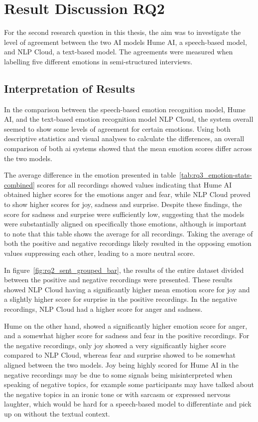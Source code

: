 
\section{Result Discussion RQ2}
For the second research question in this thesis, the aim was to investigate the level of agreement between the two AI models Hume AI, a speech-based model, and NLP Cloud, a text-based model. The agreements were measured when labelling five different emotions in semi-structured interviews.

\subsection{Interpretation of Results}
In the comparison between the speech-based emotion recognition model, Hume AI, and the text-based emotion recognition model NLP Cloud, the system overall seemed to show some levels of agreement for certain emotions. Using both descriptive statistics and visual analyses to calculate the differences, an overall comparison of both ai systems showed that the mean emotion scores differ across the two models.

The average difference in the emotion presented in table~\ref{tab:rq3_emotion-stats-combined} scores for all recordings showed values indicating that Hume AI obtained higher scores for the emotions anger and fear, while NLP Cloud proved to show higher scores for joy, sadness and surprise. Despite these findings, the score for sadness and surprise were sufficiently low, suggesting that the models were substantially aligned on specifically those emotions, although is important to note that this table shows the average for all recordings. Taking the average of both the positive and negative recordings likely resulted in the opposing emotion values suppressing each other, leading to a more neutral score.

In figure~\ref{fig:rq2_sent_grouped_bar}, the results of the entire dataset divided between the positive and negative recordings were presented. These results showed NLP Cloud having a significantly higher mean emotion score for joy and a slightly higher score for surprise in the positive recordings. In the negative recordings, NLP Cloud had a higher score for anger and sadness. 

Hume on the other hand, showed a significantly higher emotion score for anger, and a somewhat higher score for sadness and fear in the positive recordings. For the negative recordings, only joy showed a very significantly higher score compared to NLP Cloud, whereas fear and surprise showed to be somewhat aligned between the two models. Joy being highly scored for Hume AI in the negative recordings may be due to some signals being misinterpreted when speaking of negative topics, for example some participants may have talked about the negative topics in an ironic tone or with sarcasm or expressed nervous laughter, which would be hard for a speech-based model to differentiate and pick up on without the textual context.

